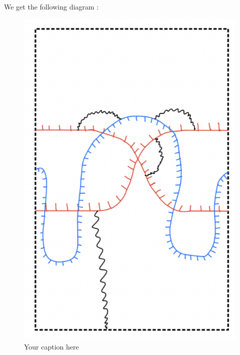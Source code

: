 We get the following diagram :
\begin{figure}[H] %
    \centering
    \includegraphics[scale=0.95]{diagrams/lemma9/4.png} %
    \caption{Your caption here}
    \label{fig:your-label}
\end{figure}

